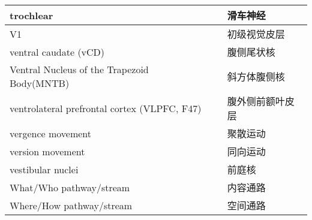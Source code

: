 \begin{longtable}{lll}
	\midrule
	trochlear   && 滑车神经  \\
	
	\midrule
	V1   && 初级视觉皮层  \\
	
	\midrule
	ventral caudate (vCD)   && 腹侧尾状核  \\
	
	\midrule
	Ventral Nucleus of the Trapezoid Body(MNTB)   && 斜方体腹侧核  \\
	
	\midrule
	ventrolateral prefrontal cortex (VLPFC, F47)   && 腹外侧前额叶皮层  \\
	
	\midrule
	vergence movement   && 聚散运动  \\
	
	\midrule
	version movement   && 同向运动  \\
	
	\midrule
	vestibular nuclei   && 前庭核  \\
	
	\midrule
	What/Who pathway/stream  && 内容通路  \\
	
	\midrule
	Where/How pathway/stream && 空间通路  \\
	
	
	\bottomrule  

\end{longtable}

